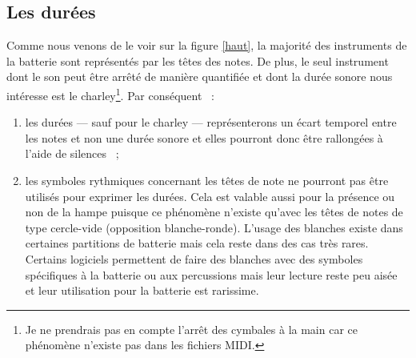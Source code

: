 \subsection*{Les durées}
\label{hho}
Comme nous venons de le voir sur la figure \ref{haut}, la majorité des
instruments de la batterie sont représentés par les têtes des notes. De plus, le seul instrument dont le son
peut être arrêté de manière quantifiée et dont la durée sonore nous intéresse
est le charley\footnote{Je ne prendrais pas en compte l’arrêt des cymbales à la
main car ce phénomène n’existe pas dans les fichiers MIDI.}.
Par conséquent~ :
\begin{enumerate}
    \item les durées — sauf pour le charley — représenterons un écart temporel
        entre les notes et non une durée sonore et elles pourront donc être
        rallongées à l’aide de silences~ ;
    \item les symboles rythmiques concernant les têtes de note ne pourront pas
        être utilisés pour exprimer les durées. Cela est valable aussi pour la
        présence ou non de la hampe puisque ce phénomène n’existe qu’avec les
        têtes de notes de type cercle-vide (opposition blanche-ronde). L’usage
        des blanches existe dans certaines partitions de batterie
        \cite{system_drums} mais cela reste dans des cas très rares. Certains
        logiciels permettent de faire des blanches avec des symboles
        spécifiques à la batterie ou aux percussions mais leur lecture reste
        peu aisée et leur utilisation pour la batterie est rarissime.\\
\end{enumerate}

